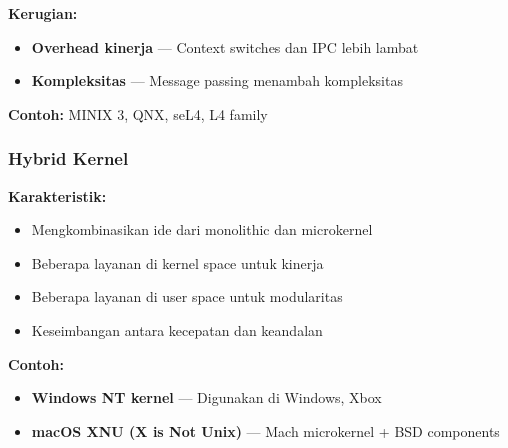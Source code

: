 \textbf{Kerugian:}
\begin{itemize}
    \item \textbf{Overhead kinerja} --- Context switches dan IPC lebih lambat
    \item \textbf{Kompleksitas} --- Message passing menambah kompleksitas
\end{itemize}

\textbf{Contoh:} MINIX 3, QNX, seL4, L4 family

\subsubsection{Hybrid Kernel}

\textbf{Karakteristik:}
\begin{itemize}
    \item Mengkombinasikan ide dari monolithic dan microkernel
    \item Beberapa layanan di kernel space untuk kinerja
    \item Beberapa layanan di user space untuk modularitas
    \item Keseimbangan antara kecepatan dan keandalan
\end{itemize}

\textbf{Contoh:}
\begin{itemize}
    \item \textbf{Windows NT kernel} --- Digunakan di Windows, Xbox
    \item \textbf{macOS XNU (X is Not Unix)} --- Mach microkernel + BSD components
\end{itemize}

